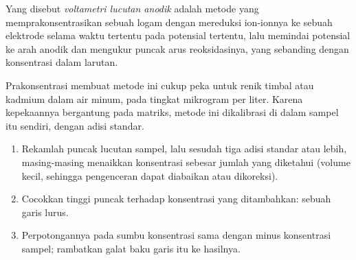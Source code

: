 \begin{definition}\label{def:b3:electrode-kinetics:stripping}
Yang disebut \emph{voltametri lucutan anodik}
adalah metode yang memprakonsentrasikan sebuah logam dengan mereduksi ion-ionnya
ke sebuah elektrode selama waktu tertentu pada potensial tertentu, lalu
memindai potensial ke arah anodik dan mengukur puncak arus reoksidasinya,
yang sebanding dengan konsentrasi dalam larutan.
\end{definition}

Prakonsentrasi membuat metode ini cukup peka untuk renik timbal atau kadmium
dalam air minum, pada tingkat mikrogram per liter. Karena kepekaannya
bergantung pada matriks, metode ini dikalibrasi di dalam sampel itu sendiri,
dengan adisi standar.

\begin{method}\label{met:b3:electrode-kinetics:standard-addition}
\begin{enumerate}
  \item Rekamlah puncak lucutan sampel, lalu sesudah tiga adisi standar atau
        lebih, masing-masing menaikkan konsentrasi sebesar jumlah yang
        diketahui (volume kecil, sehingga pengenceran dapat diabaikan atau
        dikoreksi).
  \item Cocokkan tinggi puncak terhadap konsentrasi yang ditambahkan: sebuah
        garis lurus.
  \item Perpotongannya pada sumbu konsentrasi sama dengan minus konsentrasi
        sampel; rambatkan galat baku garis itu ke hasilnya.
\end{enumerate}
\end{method}

